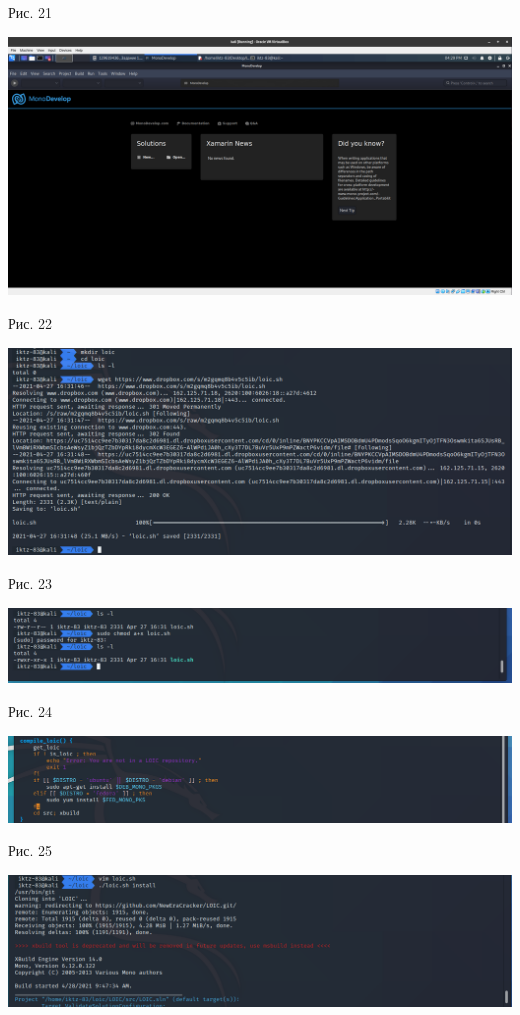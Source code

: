 \documentclass[a4paper,14pt]{extarticle}
\begin{document}
\begin{center}
        Рис. 21 

        \includegraphics[scale=0.26]{pics/22.png}

        Рис. 22 

        \includegraphics[scale=0.42]{pics/23.png}

        Рис. 23 

        \includegraphics[scale=0.4]{pics/24.png}

        Рис. 24 

        \includegraphics[scale=0.4]{pics/25.png}

        Рис. 25 

        \includegraphics[scale=0.4]{pics/26.png}


\end{center}
\end{document}
